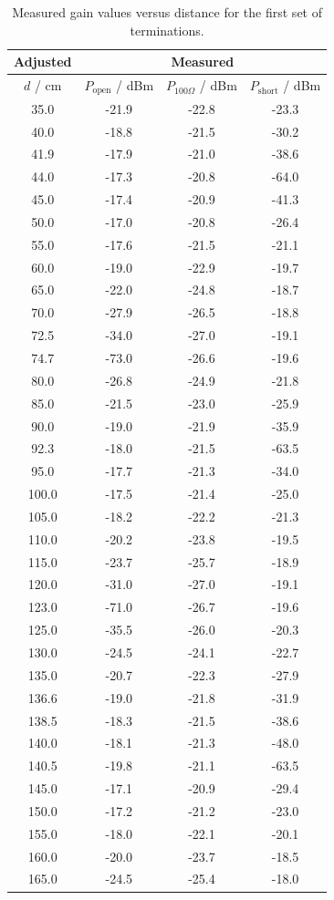 \begin{table}[ht!]
	\centering
	\begin{tabular}{|c||c|c|c|}
		\hline
	    \textbf{Adjusted} & \multicolumn{3}{c|}{\textbf{Measured}} \\
		\hline
		$d$ / cm &
		$P_{\mathrm{open}}$ / dBm &
		$P_{100\Omega}$ / dBm &
		$P_{\mathrm{short}}$ / dBm \\
		\hline\hline
		35.0 & -21.9 & -22.8 & -23.3 \\
		40.0 & -18.8 & -21.5 & -30.2 \\
		41.9 & -17.9 & -21.0 & -38.6 \\
		44.0 & -17.3 & -20.8 & -64.0 \\
		45.0 & -17.4 & -20.9 & -41.3 \\
		50.0 & -17.0 & -20.8 & -26.4 \\
		55.0 & -17.6 & -21.5 & -21.1 \\
		60.0 & -19.0 & -22.9 & -19.7 \\
		65.0 & -22.0 & -24.8 & -18.7 \\
		70.0 & -27.9 & -26.5 & -18.8 \\
		72.5 & -34.0 & -27.0 & -19.1 \\
		74.7 & -73.0 & -26.6 & -19.6 \\

		80.0 & -26.8 & -24.9 & -21.8 \\
		85.0 & -21.5 & -23.0 & -25.9 \\
		90.0 & -19.0 & -21.9 & -35.9 \\
		92.3 & -18.0 & -21.5 & -63.5 \\
		95.0 & -17.7 & -21.3 & -34.0 \\
		100.0 & -17.5 & -21.4 & -25.0 \\
		105.0 & -18.2 & -22.2 & -21.3 \\
		110.0 & -20.2 & -23.8 & -19.5 \\
		115.0 & -23.7 & -25.7 & -18.9 \\
		120.0 & -31.0 & -27.0 & -19.1 \\
		123.0 & -71.0 & -26.7 & -19.6 \\
		125.0 & -35.5 & -26.0 & -20.3 \\
		130.0 & -24.5 & -24.1 & -22.7 \\
		135.0 & -20.7 & -22.3 & -27.9 \\
		136.6 & -19.0 & -21.8 & -31.9 \\
		138.5 & -18.3 & -21.5 & -38.6 \\
		140.0 & -18.1 & -21.3 & -48.0 \\
		140.5 & -19.8 & -21.1 & -63.5 \\
		145.0 & -17.1 & -20.9 & -29.4 \\
		150.0 & -17.2 & -21.2 & -23.0 \\
		155.0 & -18.0 & -22.1 & -20.1 \\
		160.0 & -20.0 & -23.7 & -18.5 \\
		165.0 & -24.5 & -25.4 & -18.0 \\
		\hline
	\end{tabular}
	\caption{\centering Measured gain values versus distance for the first set of terminations.}
	\label{tab:power_plots_1}
\end{table}